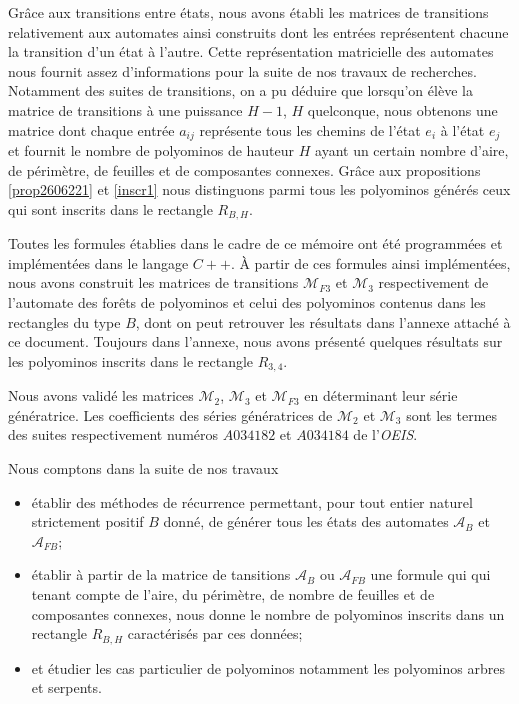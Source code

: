     Grâce aux transitions entre états, nous avons établi les matrices de transitions relativement aux automates ainsi construits dont les entrées représentent chacune la transition d'un état à l'autre. Cette représentation matricielle des automates nous fournit assez d'informations pour la suite de nos travaux de recherches. Notamment des suites de transitions, on a pu déduire que lorsqu'on élève la matrice de transitions à une puissance $H-1$, $H$ quelconque, nous obtenons une matrice dont chaque entrée $a_{ij}$ représente tous les chemins de l'état $e_{i}$ à l'état $e_{j}$ et fournit le nombre de polyominos de hauteur $H$ ayant un certain nombre d'aire, de périmètre, de feuilles et de composantes connexes. Grâce aux propositions \ref{prop2606221} et \ref{inscr1} nous distinguons parmi tous les polyominos générés ceux qui sont inscrits dans le rectangle $R_{B,H}$.
    
     Toutes les formules établies dans le cadre de ce mémoire ont été programmées et implémentées dans le langage $C++$. À partir de ces formules ainsi implémentées, nous avons construit les matrices de transitions $\mathcal{M}_{F3}$  et $\mathcal{M}_{3}$ respectivement de l'automate des forêts de polyominos et celui des polyominos contenus dans les rectangles du type $B$, dont on peut retrouver les résultats dans l'annexe attaché à ce document. Toujours dans l'annexe, nous avons présenté quelques résultats sur les polyominos inscrits dans le rectangle $R_{3,4}$.
     
     Nous avons validé les matrices $\mathcal{M}_{2}$, $\mathcal{M}_{3}$ et $\mathcal{M}_{F3}$ en déterminant leur série génératrice. Les coefficients des séries génératrices de $\mathcal{M}_{2}$ et $\mathcal{M}_{3}$  sont  les termes des suites  respectivement numéros $A034182$ et $A034184$ de l'\emph{OEIS}.
     
     
     Nous comptons dans la suite de nos travaux 
     \begin{itemize}
     \item établir des méthodes de récurrence permettant, pour tout entier naturel strictement positif $B$ donné,  de générer tous les états des automates $\mathcal{A}_{B}$ et $\mathcal{A}_{FB}$;
     \item établir à partir de la matrice de tansitions $\mathcal{A}_{B}$ ou $\mathcal{A}_{FB}$  une formule qui qui tenant compte de l'aire, du périmètre, de nombre de feuilles et de composantes connexes, nous donne le nombre de polyominos inscrits  dans un rectangle $R_{B,H}$ caractérisés par ces données;
     \item et étudier les cas particulier de polyominos notamment les polyominos arbres et serpents. 
     \end{itemize}
   
  